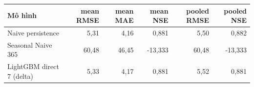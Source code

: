 \begin{tabular}{lrrrrr}
\toprule
Mô hình & mean RMSE & mean MAE & mean NSE & pooled RMSE & pooled NSE \\
\midrule
Naive persistence & 5{,}31 & 4{,}16 & 0{,}881 & 5{,}50 & 0{,}882 \\
Seasonal Naive 365 & 60{,}48 & 46{,}45 & -13{,}333 & 60{,}48 & -13{,}333 \\
LightGBM direct 7 (delta) & 5{,}33 & 4{,}17 & 0{,}881 & 5{,}52 & 0{,}881 \\
\bottomrule
\end{tabular}
